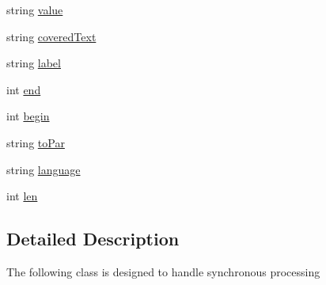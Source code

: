 \begin{DoxyCompactItemize}
\item 
string \hyperlink{class_e_u_cases_1_1_e_u_links_checker_word_add_in_1_1_e_u_links_checker_add_in_1_1_entity_a65505a34fcc7992350fb69371cc85d28}{value}
\item 
string \hyperlink{class_e_u_cases_1_1_e_u_links_checker_word_add_in_1_1_e_u_links_checker_add_in_1_1_entity_a41597a7c1b298c123128470368a99614}{covered\+Text}
\item 
string \hyperlink{class_e_u_cases_1_1_e_u_links_checker_word_add_in_1_1_e_u_links_checker_add_in_1_1_entity_af121421fead3d0968e2c3d87382a6dd9}{label}
\item 
int \hyperlink{class_e_u_cases_1_1_e_u_links_checker_word_add_in_1_1_e_u_links_checker_add_in_1_1_entity_aa85a7fa195b5efea48e195da09263ca0}{end}
\item 
int \hyperlink{class_e_u_cases_1_1_e_u_links_checker_word_add_in_1_1_e_u_links_checker_add_in_1_1_entity_a79b79b356804458f250363ee0ac29d44}{begin}
\item 
string \hyperlink{class_e_u_cases_1_1_e_u_links_checker_word_add_in_1_1_e_u_links_checker_add_in_1_1_entity_acc494caf329d801f0056b4aebd1e6e6d}{to\+Par}
\item 
string \hyperlink{class_e_u_cases_1_1_e_u_links_checker_word_add_in_1_1_e_u_links_checker_add_in_1_1_entity_a75c056546f8ab23ff28e969b0fff8d4a}{language}
\item 
int \hyperlink{class_e_u_cases_1_1_e_u_links_checker_word_add_in_1_1_e_u_links_checker_add_in_1_1_entity_ac3051d62c8481ddd505f8ad0c9742d69}{len}
\end{DoxyCompactItemize}


\subsection{Detailed Description}
The following class is designed to handle synchronous processing 



